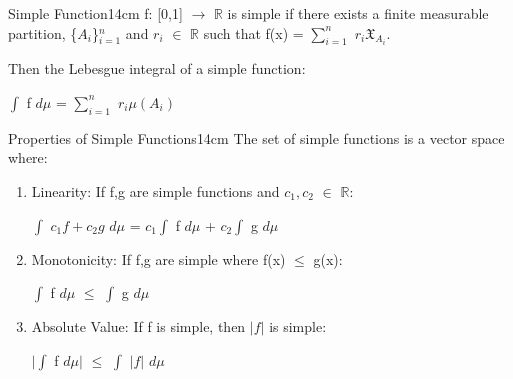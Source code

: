     \vspace{0.5cm}



    \begin{definition}{Simple Function}{14cm}
        f: [0,1] $\rightarrow$ $\mathbb{R}$ is {\color{lblue} simple}
        if there exists a finite measurable partition, \{$A_i$\}$_{i=1}^n$
        and $r_i$ $\in$ $\mathbb{R}$ such that
        f(x) = $\sum_{i=1}^n$ $r_i \mathfrak{X}_{A_i}$.

        Then the {\color{lblue} Lebesgue integral} of a simple function:

        \hspace{0.5cm}
        $\int$ f $d\mu$ = $\sum_{i=1}^n$ $r_i \mu(A_i)$
    \end{definition}

    \vspace{0.5cm}



    \begin{wtheorem}{Properties of Simple Functions}{14cm}
        The set of simple functions is a vector space where:
    \end{wtheorem}

    \begin{enumerate}[label=(\alph*), leftmargin=2cm, itemsep=0.1cm]
        \item {\color{lblue} Linearity}:
            If f,g are simple functions and $c_1,c_2$ $\in$ $\mathbb{R}$:

            \hspace{0.5cm}
            $\int$ $c_1f + c_2g$ $d\mu$
            = $c_1 \int$ f $d\mu$ + $c_2 \int$ g $d\mu$

        \item {\color{lblue} Monotonicity}:
            If f,g are simple where f(x) $\leq$ g(x):
            
            \hspace{0.5cm}
            $\int$ f $d\mu$ $\leq$ $\int$ g $d\mu$

        \item {\color{lblue} Absolute Value}:
            If f is simple, then $|f|$ is simple:

            \hspace{0.5cm}
            $|\int$ f $d\mu|$ $\leq$ $\int$ $|f|$ $d\mu$
    \end{enumerate}

